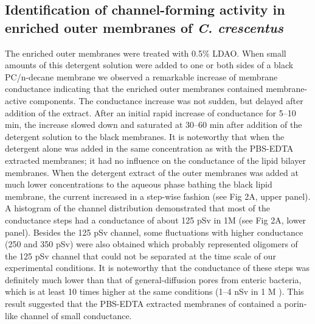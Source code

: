 \subsection{Identification of channel-forming activity in enriched outer membranes of \textit{C. crescentus}}
The enriched outer membranes were treated with 0.5\% \ac{LDAO}. When small amounts of this detergent solution were added to one or both sides of a black \ac{PC}/n-decane membrane we observed a remarkable increase of membrane conductance indicating that the enriched outer membranes contained membrane-active components. The conductance increase was not sudden, but delayed after addition of the extract. After an initial rapid increase of conductance for 5--10 min, the increase slowed down and saturated at 30--60 min after addition of the detergent solution to the black membranes. It is noteworthy that when the detergent alone was added in the same concentration as with the \ac{PBS}-\ac{EDTA} extracted membranes; it had no influence on the conductance of the lipid bilayer membranes. When the detergent extract of the outer membranes was added at much lower concentrations to the aqueous phase bathing the black lipid membrane, the current increased in a step-wise fashion (see Fig 2A, upper panel). A histogram of the channel distribution demonstrated that most of the conductance steps had a conductance of about 125 \si{\pico\sievert} in 1M  (see Fig 2A, lower panel). Besides the 125 \si{\pico\sievert} channel, some fluctuations with higher conductance (250 and 350 \si{\pico\sievert}) were also obtained which probably represented oligomers of the 125 \si{\pico\sievert} channel that could not be separated at the time scale of our experimental conditions. It is noteworthy that the conductance of these steps was definitely much lower than that of general-diffusion pores from enteric bacteria, which is at least 10 times higher at the same conditions (1--4 \si{\nano\sievert} in 1 M ). This result suggested that the \ac{PBS}-\ac{EDTA} extracted membranes of \caulobacter contained a porin-like channel of small conductance. 

